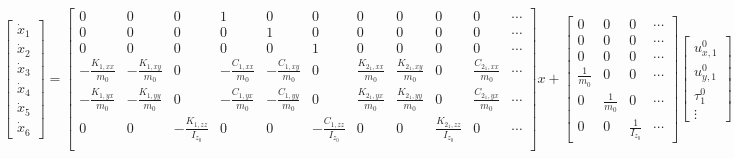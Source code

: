 \documentclass[12pt,letterpaper]{report}
\begin{document}
{\small
\setlength{\arraycolsep}{3pt}
\begin{equation}
\begin{bmatrix}\dot{x}_1\\\dot{x}_2\\\dot{x}_3\\\dot{x}_4\\\dot{x}_5\\\dot{x}_6\end{bmatrix}
=
\begin{bmatrix}
    0 & 0 & 0 & 1 & 0 & 0 & 0 & 0 & 0 & 0 & \cdots \\
    0 & 0 & 0 & 0 & 1 & 0 & 0 & 0 & 0 & 0 & \cdots \\
    0 & 0 & 0 & 0 & 0 & 1 & 0 & 0 & 0 & 0 & \cdots \\
    -\frac{K_{1,xx}}{m_0} & -\frac{K_{1,xy}}{m_0} & 0 & -\frac{C_{1,xx}}{m_0} & -\frac{C_{1,xy}}{m_0} & 0 & \frac{K_{2_1,xx}}{m_0} & \frac{K_{2_1,xy}}{m_0} & 0 & \frac{C_{2_1,xx}}{m_0} & \cdots \\
    -\frac{K_{1,yx}}{m_0} & -\frac{K_{1,yy}}{m_0} & 0 & -\frac{C_{1,yx}}{m_0} & -\frac{C_{1,yy}}{m_0} & 0 & \frac{K_{2_1,yx}}{m_0} & \frac{K_{2_1,yy}}{m_0} & 0 & \frac{C_{2_1,yx}}{m_0} & \cdots \\
    0 & 0 & -\frac{K_{1,zz}}{I_{z_0}} & 0 & 0 & -\frac{C_{1,zz}}{I_{z_0}} & 0 & 0 & \frac{K_{2_1,zz}}{I_{z_0}} & 0 & \cdots \\
\end{bmatrix}
x
+
\begin{bmatrix}
    0 & 0 & 0 & \cdots \\
    0 & 0 & 0 & \cdots \\
    0 & 0 & 0 & \cdots \\
    \frac{1}{m_0} & 0 & 0 & \cdots \\
    0 & \frac{1}{m_0} & 0 & \cdots \\
    0 & 0 & \frac{1}{I_{z_0}} & \cdots
\end{bmatrix}
\begin{bmatrix}u^0_{x,1}\\u^0_{y,1}\\\tau^0_1\\\vdots\end{bmatrix}
\end{equation}
}
\end{document}
